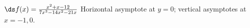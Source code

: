 {$\ds f(x)=\frac{x^2+x-12}{7 x^3-14 x^2-21 x}$
}
{Horizontal asymptote at $y=0$; vertical asymptotes at $x=-1,0$.
}
